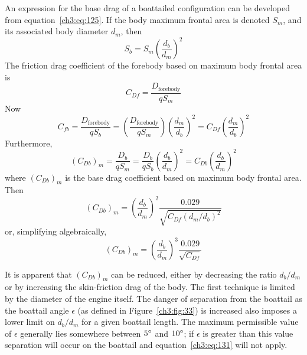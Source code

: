 An expression for the base drag of a boattailed configuration can be developed
from equation~\eqref{ch3:eq:125}. If the body maximum frontal area is denoted
$S_m$, and its associated body diameter $d_m$, then
\begin{equation}\label{ch3:eq:126}
S_b = S_m\left(\frac{d_b}{d_m}\right)^{2}
\end{equation}
The friction drag coefficient of the forebody based on maximum body frontal
area is
\begin{equation}\label{ch3:eq:127}
C_{Df} = \frac{D_{\mathrm{forebody}}}{q S_m}
\end{equation}
Now
\begin{equation}\label{ch3:eq:128}
C_{fb} = \frac{D_{\mathrm{forebody}}}{q S_b}
  = \left(\frac{D_{\mathrm{forebody}}}{q S_m}\right)\left(\frac{d_m}{d_b}\right)^{2}
  = C_{Df}\left(\frac{d_m}{d_b}\right)^{2}
\end{equation}
Furthermore,
\begin{equation}\label{ch3:eq:129}
(C_{Db})_m = \frac{D_b}{q S_m} = \frac{D_b}{q S_b}\left(\frac{d_b}{d_m}\right)^{2}
  = C_{Db}\left(\frac{d_b}{d_m}\right)^{2}
\end{equation}
where $(C_{Db})_m$ is the base drag coefficient based on maximum body frontal
area. Then
\begin{equation}\label{ch3:eq:130}
(C_{Db})_m = \left(\frac{d_b}{d_m}\right)^{2}\frac{0.029}{\sqrt{C_{Df}(d_m/d_b)^{2}}}
\end{equation}
or, simplifying algebraically,
\begin{equation}\label{ch3:eq:131}
(C_{Db})_m = \left(\frac{d_b}{d_m}\right)^{3}\frac{0.029}{\sqrt{C_{Df}}}
\end{equation}

It is apparent that $(C_{Db})_m$ can be reduced, either by decreasing the ratio
$d_b/d_m$ or by increasing the skin-friction drag of the body. The first
technique is limited by the diameter of the engine itself. The danger of
separation from the boattail as the boattail angle $\epsilon$ (as defined in
Figure~\ref{ch3:fig:33}) is increased also imposes a lower limit on $d_b/d_m$
for a given boattail length. The maximum permissible value of $\epsilon$
generally lies somewhere between $5^{\circ}$ and $10^{\circ}$; if $\epsilon$ is greater
than this value separation will occur on the boattail and
equation~\eqref{ch3:eq:131} will not apply.

